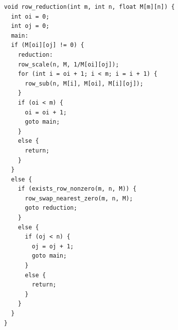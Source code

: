 \begin{verbatim}
  void row_reduction(int m, int n, float M[m][n]) {
    int oi = 0;
    int oj = 0;
    main:
    if (M[oi][oj] != 0) {
      reduction:
      row_scale(n, M, 1/M[oi][oj]);
      for (int i = oi + 1; i < m; i = i + 1) {
        row_sub(n, M[i], M[oi], M[i][oj]);
      }
      if (oi < m) {
        oi = oi + 1;
        goto main;
      }
      else {
        return;
      }
    }
    else {
      if (exists_row_nonzero(m, n, M)) {
        row_swap_nearest_zero(m, n, M);
        goto reduction;
      }
      else {
        if (oj < n) {
          oj = oj + 1;
          goto main;
        }
        else {
          return;
        }
      }
    }
  }
\end{verbatim}
